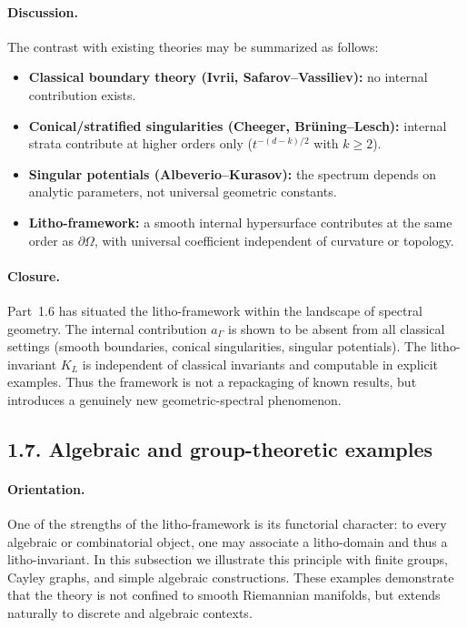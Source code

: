 \paragraph{Discussion.}
The contrast with existing theories may be summarized as follows:
\begin{itemize}
\item \textbf{Classical boundary theory (Ivrii, Safarov–Vassiliev):}
no internal contribution exists.
\item \textbf{Conical/stratified singularities (Cheeger, Brüning–Lesch):}
internal strata contribute at higher orders only ($t^{-(d-k)/2}$ with $k\ge 2$).
\item \textbf{Singular potentials (Albeverio–Kurasov):}
the spectrum depends on analytic parameters, not universal geometric constants.
\item \textbf{Litho-framework:}
a smooth internal hypersurface contributes at the same order as $\partial\Omega$,
with universal coefficient independent of curvature or topology.
\end{itemize}

\paragraph{Closure.}
Part~1.6 has situated the litho-framework within the landscape of
spectral geometry. The internal contribution $a_\Gamma$ is shown to be
absent from all classical settings (smooth boundaries, conical singularities,
singular potentials). The litho-invariant $K_L$ is independent of
classical invariants and computable in explicit examples.
Thus the framework is not a repackaging of known results, but introduces
a genuinely new geometric-spectral phenomenon.

\subsection*{1.7. Algebraic and group-theoretic examples}

\paragraph{Orientation.}
One of the strengths of the litho-framework is its functorial character:
to every algebraic or combinatorial object, one may associate a litho-domain
and thus a litho-invariant. In this subsection we illustrate this principle
with finite groups, Cayley graphs, and simple algebraic constructions.
These examples demonstrate that the theory is not confined to smooth
Riemannian manifolds, but extends naturally to discrete and algebraic contexts.

